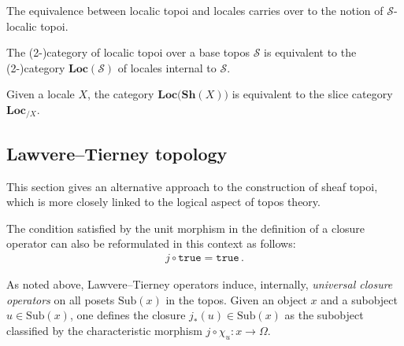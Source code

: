     The equivalence between localic topoi and locales carries over to the notion of $\mathcal{S}$-localic topoi.
    \begin{property}
        The (2-)category of localic topoi over a base topos $\mathcal{S}$ is equivalent to the (2-)category $\mathbf{Loc}(\mathcal{S})$ of locales internal to $\mathcal{S}$.
    \end{property}
    \begin{property}\label{topos:slice_locale}
        Given a locale $X$, the category $\mathbf{Loc}\big(\mathbf{Sh}(X)\big)$ is equivalent to the slice category $\mathbf{Loc}_{/X}$.
    \end{property}

\subsection{Lawvere--Tierney topology}

    This section gives an alternative approach to the construction of sheaf topoi, which is more closely linked to the logical aspect of topos theory.

    \begin{remark}
        The condition satisfied by the unit morphism in the definition of a closure operator can also be reformulated in this context as follows:
        \begin{gather}
            j\circ\texttt{true} = \texttt{true}\,.
        \end{gather}
    \end{remark}
    
    As noted above, Lawvere--Tierney operators induce, internally, \textit{universal closure operators} on all posets $\mathrm{Sub}(x)$ in the topos. Given an object $x$ and a subobject $u\in\text{Sub}(x)$, one defines the closure $j_\ast(u)\in\text{Sub}(x)$ as the subobject classified by the characteristic morphism $j\circ\chi_u:x\rightarrow\Omega$.

